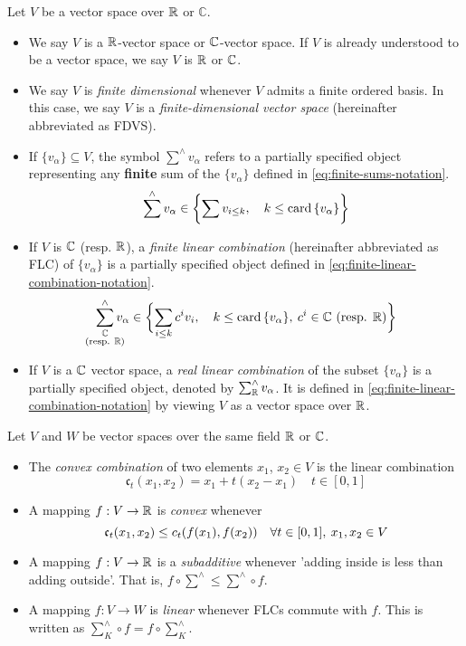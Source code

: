 \documentclass[../main-v2-manifolds.tex]{subfiles}
\begin{document}
Let $V$ be a vector space over $\mathbb{R}$ or $\mathbb{C}$. 
\begin{itemize}
    \item We say $V$ is a $\mathbb{R}$-vector space or ${\mathbb{C}}$-vector space. If $V$ is already understood to be a vector space, we say $V$ is $\mathbb{R}$ or ${\mathbb{C}}$.
    \item We say $V$ is \emph{finite dimensional} whenever $V$ admits a finite ordered basis. In this case, we say $V$ is a \emph{finite-dimensional vector space} (hereinafter abbreviated as FDVS).
    \item If $\{v_{\alpha}\}\subseteq V$, the symbol $\sum^{\wedge}v_\alpha$ refers to a partially specified object representing any \textbf{finite} sum of the $\{v_{\alpha}\}$ defined in \cref{eq:finite-sums-notation}.
    \begin{equation}\label{eq:finite-sums-notation}
    \sum^\wedge v_{\alpha} \in\biggl\{{\sum v_{i\leq k},\quad k\leq \operatorname{card}{\{v_\alpha\}}}\biggr\}
    \end{equation}
    \item If $V$ is ${\mathbb{C}}$ (resp. $\mathbb{R}$), a \emph{finite linear combination} (hereinafter abbreviated as FLC) of $\{v_\alpha\}$ is a partially specified object defined in \cref{eq:finite-linear-combination-notation}.
    \begin{equation}
        \sum^\wedge_{\mathclap{\substack{\complex\\(\text{resp. }\real)}}}v_\alpha \in\bigset{\sum_{i\leq k}c^iv_i,\quad k\leq\card{\{v_\alpha\}},\: c^i\in\complex \text{ (resp. }\real\text{)}}
        \label{eq:finite-linear-combination-notation}
    \end{equation}
    \item If $V$ is a ${\mathbb{C}}$ vector space, a \emph{real linear combination} of the subset $\{v_{\alpha}\}$ is a partially specified object, denoted by $\sum^\wedge_{\mathbb{R}} v_{\alpha}$. It is defined in \cref{eq:finite-linear-combination-notation} by viewing $V$ as a vector space over $\mathbb{R}$.
    \end{itemize}
    Let $V$ and $W$ be vector spaces over the same field $\mathbb{R}$ or ${\mathbb{C}}$.
    \begin{itemize}
    \item The \emph{convex combination} of two elements $x_1$, $x_2\in V$ is the linear combination 
    \[
        \mathfrak{c}_t(x_1, x_2) = x_1 + t(x_2 - x_1) \quad t\in [0,1]
    \]
    \item A mapping $f: V\to \mathbb{R}$ is \emph{convex} whenever 
    \[
        \mathfrak{c}_t(x_1, x_2)\leq c_t\qty(f(x_1),f(x_2))\quad\forall t\in[0,1],\: x_1,x_2\in V
    \]
    \item A mapping $f: V\to \mathbb{R}$ is a \emph{subadditive} whenever 'adding inside is less than adding outside'. That is, $f\circ\sum^\wedge\leq \sum^\wedge\circ f$.
    \item A mapping $f: V\to W$ is \emph{linear} whenever FLCs commute with $f$. This is written as $\sum^\wedge_K \circ f = f\circ \sum^\wedge_K$.
\end{itemize}
\end{document}
